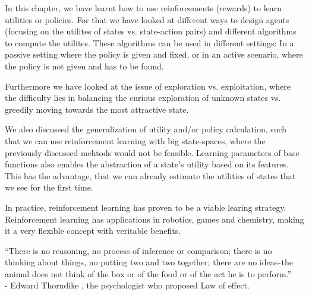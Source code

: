 \documentclass{llncs}
\begin{document}
In this chapter, we have learnt how to use reinforcements (rewards) to learn utilities or policies. For that we have looked at different ways to design agents (focusing on the utilites of states vs. state-action pairs) and different algorithms to compute the utilites. These algorithms can be used in different settings: In a passive setting where the policy is given and fixed, or in an active scenario, where the policy is not given and has to be found.\par
Furthermore we have looked at the issue of exploration vs. exploitation, where the difficulty lies in balancing the curious exploration of unknown states vs. greedily moving towards the most attractive state.\par
We also discussed the generalization of utility and/or policy calculation, such that we can use reinforcement learning with big state-spaces, where the  previously discussed mehtods would not be feasible. Learning parameters of base functions also enables the abstraction of a state's utility based on its features. This has the advantage, that we can already estimate the utilities of states that we see for the first time.
\\\par
In practice, reinforcement learning has proven to be a viable learing strategy. Reinforcement learning has applications in robotics, games and chemistry, making it a very flexible concept with veritable benefits.
\\\par
``There is no reasoning, no process of inference or comparison; there is no thinking about things, no putting two and two together; there are no ideas - the animal does not think of the box or of the food or of the act he is to perform.''\\
- Edward Thorndike \cite{thorndike1965animal}, the psychologist who proposed Law of effect.


\newpage



\end{document}
